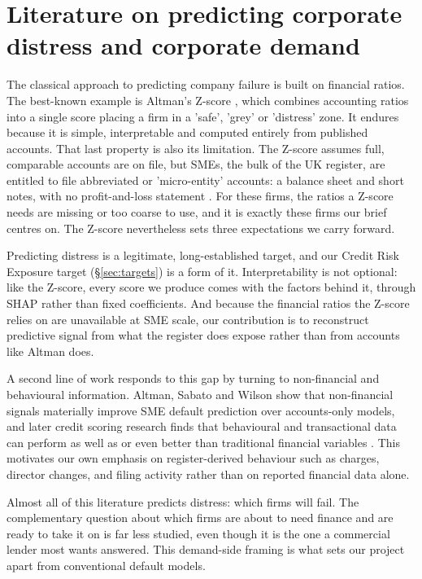 \documentclass[    author={Samuel Menon Demelo; Sneha Saphala Ram Prasad; 
Viktor Ander Lindholm; Vishal Khatri},
               supervisor={Prof. Fernando Moreno-Pino},
                   degree={MSc},
                    title={Lloyds Commercial Banking Intelligence},
                 subtitle={Ranking SME Lending, Risk and Growth Prospects for Lloyds Banking Group},
                     type={},
                     year={2026}]{dissertation}
\begin{document}
\section{Literature on predicting corporate distress and corporate demand}
The classical approach to predicting company failure is built on financial ratios. The best-known example is Altman's Z-score \cite{altman_1968}, which combines accounting ratios into a single score placing a firm in a 'safe', 'grey' or 'distress' zone. It endures because it is simple, interpretable and computed entirely from published accounts. That last property is also its limitation. The Z-score assumes full, comparable accounts are on file, but SMEs, the bulk of the UK register, are entitled to file abbreviated or 'micro-entity' accounts: a balance sheet and short notes, with no profit-and-loss statement \cite{companieshouse_accounts_2026}. For these firms, the ratios a Z-score needs are missing or too coarse to use, and it is exactly these firms our brief centres on. The Z-score nevertheless sets three expectations we carry forward. 

Predicting distress is a legitimate, long-established target, and our Credit Risk Exposure target (\S\ref{sec:targets}) is a form of it. Interpretability is not optional: like the Z-score, every score we produce comes with the factors behind it, through SHAP rather than fixed coefficients. And because the financial ratios the Z-score relies on are unavailable at SME scale, our contribution is to reconstruct predictive signal from what the register does expose rather than from accounts like Altman does.

A second line of work responds to this gap by turning to non-financial and behavioural information. Altman, Sabato and Wilson \cite{altman_sabato_wilson_2010} show that non-financial signals materially improve SME default prediction over accounts-only models, and later credit scoring research finds that behavioural and transactional data can perform as well as or even better than traditional financial variables \cite{berg_etal_2020}. This motivates our own emphasis on register-derived behaviour such as charges, director changes, and filing activity rather than on reported financial data alone.

Almost all of this literature predicts distress: which firms will fail. The complementary question about which firms are about to need finance and are ready to take it on is far less studied, even though it is the one a commercial lender most wants answered. This demand-side framing is what sets our project apart from conventional default models.
\end{document}

